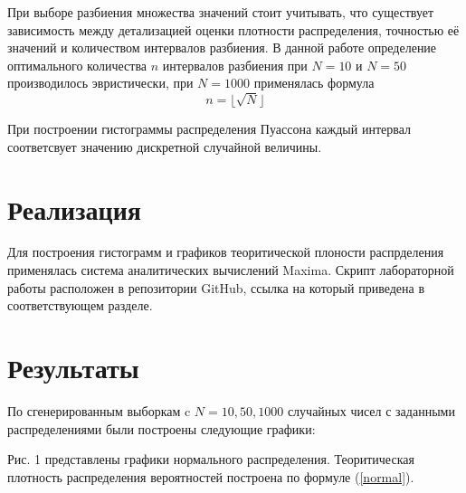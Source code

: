 \documentclass[12pt]{article}
\newcommand{\lskip}{\hfill\break}
\begin{document}
\begin{flushleft}
        При выборе разбиения множества значений стоит учитывать, что существует зависимость между детализацией оценки плотности распределения, точностью её значений и количеством интервалов разбиения. В данной работе определение оптимального количества $n$ интервалов разбиения при $N = 10$ и $N = 50$ производилось эвристически, при $N = 1000$ применялась формула
        \begin{equation}
            n = \lfloor \sqrt{N} \rfloor
        \end{equation}

        При построении гистограммы распределения Пуассона каждый интервал соответсвует значению дискретной случайной величины.

\newpage

\section{Реализация}

    Для построения гистограмм и графиков теоритической плоности распрделения применялась система аналитических вычислений Maxima. Скрипт лабораторной работы расположен в репозитории GitHub, ссылка на который приведена в соответствующем разделе.

\newpage

\section{Результаты}

    По сгенерированным выборкам c $N = 10, 50, 1000$ случайных чисел с заданными распределениями были построены следующие графики:
    \lskip

     Рис. 1 представлены графики нормального распределения. Теоритическая плотность распределения вероятностей построена по формуле (\ref{normal}).


\end{flushleft}
\end{document}
